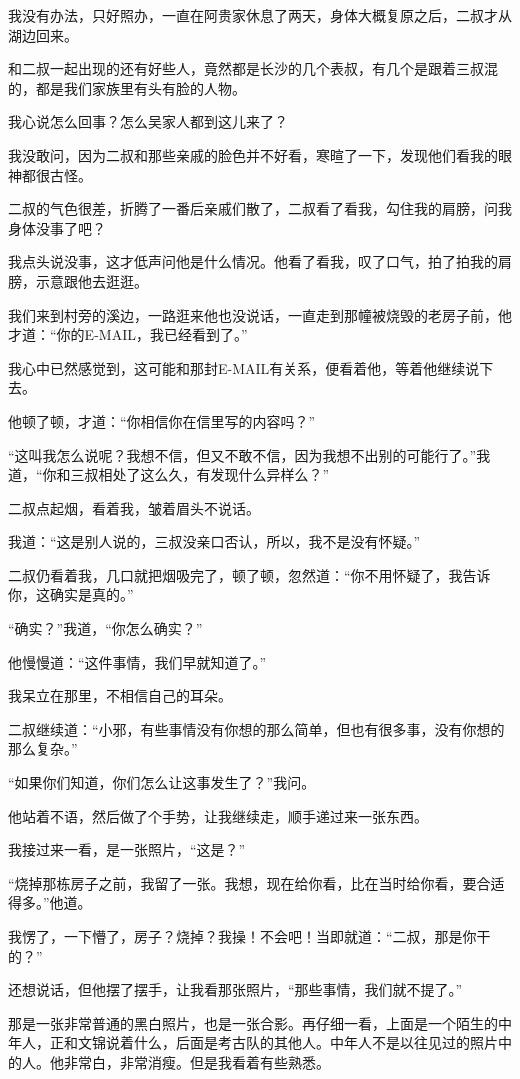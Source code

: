 我没有办法，只好照办，一直在阿贵家休息了两天，身体大概复原之后，二叔才从湖边回来。

和二叔一起出现的还有好些人，竟然都是长沙的几个表叔，有几个是跟着三叔混的，都是我们家族里有头有脸的人物。

我心说怎么回事？怎么吴家人都到这儿来了？

我没敢问，因为二叔和那些亲戚的脸色并不好看，寒暄了一下，发现他们看我的眼神都很古怪。

二叔的气色很差，折腾了一番后亲戚们散了，二叔看了看我，勾住我的肩膀，问我身体没事了吧？

我点头说没事，这才低声问他是什么情况。他看了看我，叹了口气，拍了拍我的肩膀，示意跟他去逛逛。

我们来到村旁的溪边，一路逛来他也没说话，一直走到那幢被烧毁的老房子前，他才道：“你的E-MAIL，我已经看到了。”

我心中已然感觉到，这可能和那封E-MAIL有关系，便看着他，等着他继续说下去。

他顿了顿，才道：“你相信你在信里写的内容吗？”

“这叫我怎么说呢？我想不信，但又不敢不信，因为我想不出别的可能行了。”我道，“你和三叔相处了这么久，有发现什么异样么？”

二叔点起烟，看着我，皱着眉头不说话。

我道：“这是别人说的，三叔没亲口否认，所以，我不是没有怀疑。”

二叔仍看着我，几口就把烟吸完了，顿了顿，忽然道：“你不用怀疑了，我告诉你，这确实是真的。”

“确实？”我道，“你怎么确实？”

他慢慢道：“这件事情，我们早就知道了。”

我呆立在那里，不相信自己的耳朵。

二叔继续道：“小邪，有些事情没有你想的那么简单，但也有很多事，没有你想的那么复杂。”

“如果你们知道，你们怎么让这事发生了？”我问。

他站着不语，然后做了个手势，让我继续走，顺手递过来一张东西。

我接过来一看，是一张照片，“这是？”

“烧掉那栋房子之前，我留了一张。我想，现在给你看，比在当时给你看，要合适得多。”他道。

我愣了，一下懵了，房子？烧掉？我操！不会吧！当即就道：“二叔，那是你干的？”

还想说话，但他摆了摆手，让我看那张照片，“那些事情，我们就不提了。”

那是一张非常普通的黑白照片，也是一张合影。再仔细一看，上面是一个陌生的中年人，正和文锦说着什么，后面是考古队的其他人。中年人不是以往见过的照片中的人。他非常白，非常消瘦。但是我看着有些熟悉。

